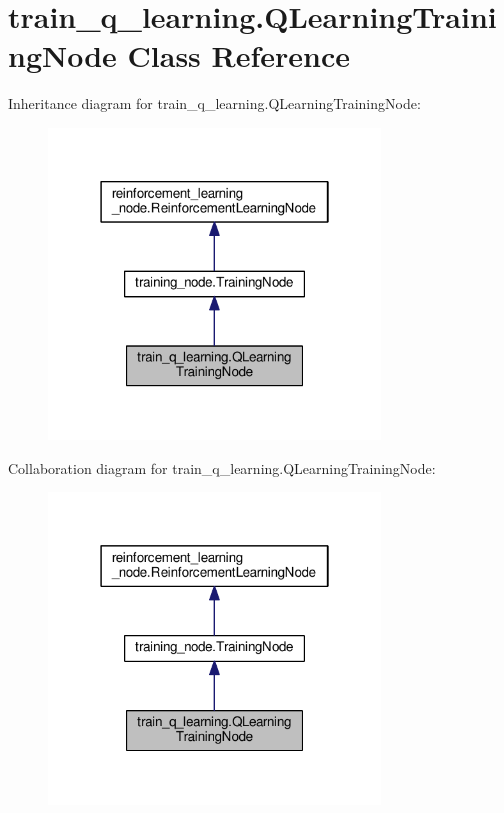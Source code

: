 \hypertarget{classtrain__q__learning_1_1_q_learning_training_node}{}\section{train\+\_\+q\+\_\+learning.\+Q\+Learning\+Training\+Node Class Reference}
\label{classtrain__q__learning_1_1_q_learning_training_node}


Inheritance diagram for train\+\_\+q\+\_\+learning.\+Q\+Learning\+Training\+Node\+:
\nopagebreak
\begin{figure}[H]
\begin{center}
\leavevmode
\includegraphics[width=250pt]{classtrain__q__learning_1_1_q_learning_training_node__inherit__graph}
\end{center}
\end{figure}


Collaboration diagram for train\+\_\+q\+\_\+learning.\+Q\+Learning\+Training\+Node\+:
\nopagebreak
\begin{figure}[H]
\begin{center}
\leavevmode
\includegraphics[width=250pt]{classtrain__q__learning_1_1_q_learning_training_node__coll__graph}
\end{center}
\end{figure}
